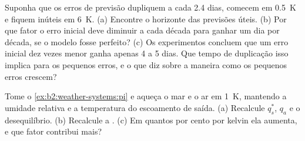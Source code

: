 \begin{exercise}[$\star\star\star$]\label{exo:b2:weather-systems:11}
Suponha que os erros de previsão dupliquem a cada 2.4 dias, comecem em \qty{0.5}{K} e fiquem inúteis em
\qty{6}{K}. (a) Encontre o horizonte das previsões úteis. (b) Por que fator o erro inicial deve
diminuir a cada década para ganhar um dia por década, se o modelo fosse perfeito? (c) Os experimentos concluem que
um erro inicial dez vezes menor ganha apenas 4 a 5 dias. Que tempo de duplicação isso implica para os
pequenos erros, e o que diz sobre a maneira como os pequenos erros crescem?
\end{exercise}

\begin{exercise}[$\star\star\star$]\label{exo:b2:weather-systems:12}
Tome o \cref{ex:b2:weather-systems:pi} e aqueça o mar e o ar em \qty{1}{K}, mantendo a
umidade relativa e a temperatura do escoamento de saída. (a) Recalcule $q_s^*$, $q_a$ e o
desequilíbrio. (b) Recalcule a . (c) Em quantos por cento por kelvin
ela aumenta, e que fator contribui mais?
\end{exercise}

